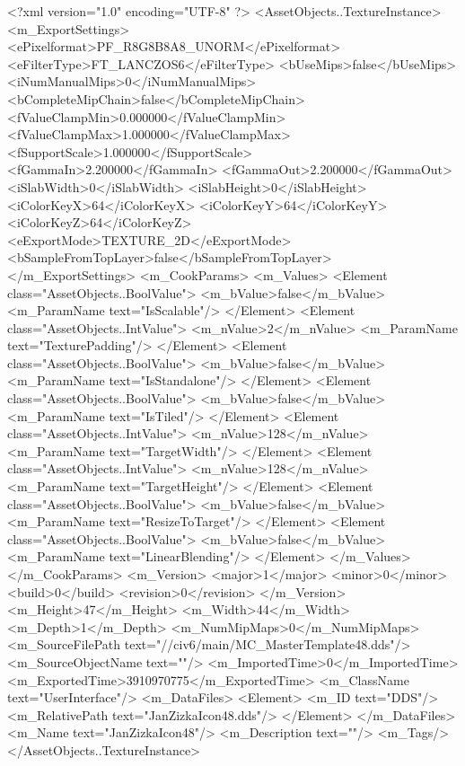 <?xml version="1.0" encoding="UTF-8" ?>
<AssetObjects..TextureInstance>
	<m_ExportSettings>
		<ePixelformat>PF_R8G8B8A8_UNORM</ePixelformat>
		<eFilterType>FT_LANCZOS6</eFilterType>
		<bUseMips>false</bUseMips>
		<iNumManualMips>0</iNumManualMips>
		<bCompleteMipChain>false</bCompleteMipChain>
		<fValueClampMin>0.000000</fValueClampMin>
		<fValueClampMax>1.000000</fValueClampMax>
		<fSupportScale>1.000000</fSupportScale>
		<fGammaIn>2.200000</fGammaIn>
		<fGammaOut>2.200000</fGammaOut>
		<iSlabWidth>0</iSlabWidth>
		<iSlabHeight>0</iSlabHeight>
		<iColorKeyX>64</iColorKeyX>
		<iColorKeyY>64</iColorKeyY>
		<iColorKeyZ>64</iColorKeyZ>
		<eExportMode>TEXTURE_2D</eExportMode>
		<bSampleFromTopLayer>false</bSampleFromTopLayer>
	</m_ExportSettings>
	<m_CookParams>
		<m_Values>
			<Element class="AssetObjects..BoolValue">
				<m_bValue>false</m_bValue>
				<m_ParamName text="IsScalable"/>
			</Element>
			<Element class="AssetObjects..IntValue">
				<m_nValue>2</m_nValue>
				<m_ParamName text="TexturePadding"/>
			</Element>
			<Element class="AssetObjects..BoolValue">
				<m_bValue>false</m_bValue>
				<m_ParamName text="IsStandalone"/>
			</Element>
			<Element class="AssetObjects..BoolValue">
				<m_bValue>false</m_bValue>
				<m_ParamName text="IsTiled"/>
			</Element>
			<Element class="AssetObjects..IntValue">
				<m_nValue>128</m_nValue>
				<m_ParamName text="TargetWidth"/>
			</Element>
			<Element class="AssetObjects..IntValue">
				<m_nValue>128</m_nValue>
				<m_ParamName text="TargetHeight"/>
			</Element>
			<Element class="AssetObjects..BoolValue">
				<m_bValue>false</m_bValue>
				<m_ParamName text="ResizeToTarget"/>
			</Element>
			<Element class="AssetObjects..BoolValue">
				<m_bValue>false</m_bValue>
				<m_ParamName text="LinearBlending"/>
			</Element>
		</m_Values>
	</m_CookParams>
	<m_Version>
		<major>1</major>
		<minor>0</minor>
		<build>0</build>
		<revision>0</revision>
	</m_Version>
	<m_Height>47</m_Height>
	<m_Width>44</m_Width>
	<m_Depth>1</m_Depth>
	<m_NumMipMaps>0</m_NumMipMaps>
	<m_SourceFilePath text="//civ6/main/MC_MasterTemplate\Textures\JanZizkaIcon48.dds"/>
	<m_SourceObjectName text=""/>
	<m_ImportedTime>0</m_ImportedTime>
	<m_ExportedTime>3910970775</m_ExportedTime>
	<m_ClassName text="UserInterface"/>
	<m_DataFiles>
		<Element>
			<m_ID text="DDS"/>
			<m_RelativePath text="JanZizkaIcon48.dds"/>
		</Element>
	</m_DataFiles>
	<m_Name text="JanZizkaIcon48"/>
	<m_Description text=""/>
	<m_Tags/>
</AssetObjects..TextureInstance>

